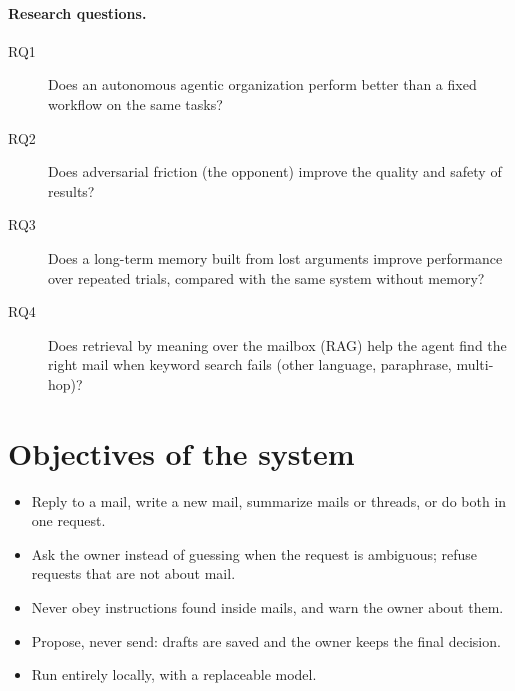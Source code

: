 \documentclass[11pt,a4paper]{article}
\begin{document}
\paragraph{Research questions.}
\begin{description}
  \item[RQ1] Does an autonomous agentic organization perform better than a fixed workflow on the same tasks?
  \item[RQ2] Does adversarial friction (the opponent) improve the quality and safety of results?
  \item[RQ3] Does a long-term memory built from lost arguments improve performance over repeated trials,
             compared with the same system without memory?
  \item[RQ4] Does retrieval by meaning over the mailbox (RAG) help the agent find the right mail when keyword
             search fails (other language, paraphrase, multi-hop)?
\end{description}

\section{Objectives of the system}
\begin{itemize}
  \item Reply to a mail, write a new mail, summarize mails or threads, or do both in one request.
  \item Ask the owner instead of guessing when the request is ambiguous; refuse requests that are not about mail.
  \item Never obey instructions found inside mails, and warn the owner about them.
  \item Propose, never send: drafts are saved and the owner keeps the final decision.
  \item Run entirely locally, with a replaceable model.
\end{itemize}

\end{document}
